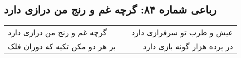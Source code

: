 \begin{center}
\section*{رباعی شماره ۸۴: گرچه غم و رنج من درازی دارد}
\label{sec:sh084}
\begin{longtable}{l p{0.5cm} r}
گرچه غم و رنج من درازی دارد
&&
عیش و طرب تو سرفرازی دارد
\\
بر هر دو مکن تکیه که دوران فلک
&&
در پرده هزار گونه بازی دارد
\\
\end{longtable}
\end{center}
